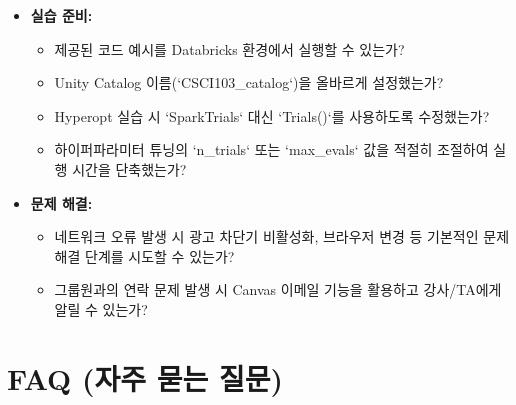 \documentclass[11pt,a4paper]{article}
\begin{document}
\begin{tcolorbox}[summarybox={학습 및 문서 작성 점검표}]
\begin{itemize}
\begin{itemize}
        \item Spark UDF를 사용하여 등록된 모델로 대규모 배치 추론을 수행할 수 있는가?
    \end{itemize}
    \item \textbf{실습 준비:}
    \begin{itemize}
        \item 제공된 코드 예시를 Databricks 환경에서 실행할 수 있는가?
        \item Unity Catalog 이름(`CSCI103_catalog`)을 올바르게 설정했는가?
        \item Hyperopt 실습 시 `SparkTrials` 대신 `Trials()`를 사용하도록 수정했는가?
        \item 하이퍼파라미터 튜닝의 `n_trials` 또는 `max_evals` 값을 적절히 조절하여 실행 시간을 단축했는가?
    \end{itemize}
    \item \textbf{문제 해결:}
    \begin{itemize}
        \item 네트워크 오류 발생 시 광고 차단기 비활성화, 브라우저 변경 등 기본적인 문제 해결 단계를 시도할 수 있는가?
        \item 그룹원과의 연락 문제 발생 시 Canvas 이메일 기능을 활용하고 강사/TA에게 알릴 수 있는가?
    \end{itemize}
\end{itemize}
\end{tcolorbox}

\newpage
\section*{FAQ (자주 묻는 질문)}
\end{document}
